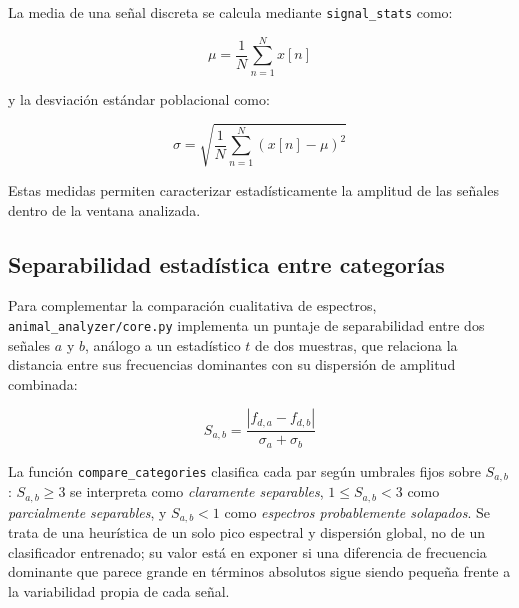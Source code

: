 La media de una señal discreta se calcula mediante \texttt{signal\_stats} como:

\begin{equation}
\mu =
\frac{1}{N}
\sum_{n=1}^{N}x[n]
\end{equation}

y la desviación estándar poblacional como:

\begin{equation}
\sigma =
\sqrt{
\frac{1}{N}
\sum_{n=1}^{N}
(x[n]-\mu)^2
}
\end{equation}

Estas medidas permiten caracterizar estadísticamente la amplitud de las señales dentro de la ventana analizada.

\subsection{Separabilidad estadística entre categorías}
\label{sec:separabilidad}

Para complementar la comparación cualitativa de espectros, \texttt{animal\_analyzer/core.py} implementa un puntaje de separabilidad entre dos señales $a$ y $b$, análogo a un estadístico $t$ de dos muestras, que relaciona la distancia entre sus frecuencias dominantes con su dispersión de amplitud combinada:

\begin{equation}
S_{a,b} = \frac{\left| f_{d,a} - f_{d,b} \right|}{\sigma_a + \sigma_b}
\label{eq:separabilidad}
\end{equation}

La función \texttt{compare\_categories} clasifica cada par según umbrales fijos sobre $S_{a,b}$: $S_{a,b} \geq 3$ se interpreta como \emph{claramente separables}, $1 \leq S_{a,b} < 3$ como \emph{parcialmente separables}, y $S_{a,b} < 1$ como \emph{espectros probablemente solapados}. Se trata de una heurística de un solo pico espectral y dispersión global, no de un clasificador entrenado; su valor está en exponer si una diferencia de frecuencia dominante que parece grande en términos absolutos sigue siendo pequeña frente a la variabilidad propia de cada señal.

